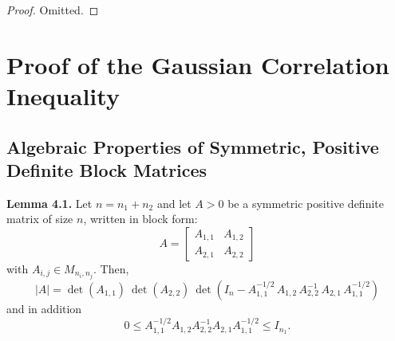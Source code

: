 \documentclass[12pt]{article}
\begin{document}
\begin{proof}
    Omitted.
\end{proof}

\section{Proof of the Gaussian Correlation Inequality}

\subsection{Algebraic Properties of Symmetric, Positive Definite Block Matrices}

\textbf{Lemma 4.1.} Let $n = n_1 + n_2$ and let $A > 0$ be a symmetric positive definite matrix of size $n$, written in block form:
\[
A =
\begin{bmatrix}
A_{1,1} & A_{1,2} \\
A_{2,1} & A_{2,2}
\end{bmatrix}
\]
with $A_{i,j} \in M_{n_i, n_j}$.
Then,
\[
|A| =\det(A_{1,1}) \ \det(A_{2,2}) \ \det\!\left(I_n - A^{-1/2}_{1,1} \, A_{1,2} \, A^{-1}_{2,2} \, A_{2,1} \, A^{-1/2}_{1,1}\right)
\]
and in addition
\[
0 \leq A_{1,1}^{-1/2} A_{1,2} A_{2,2}^{-1} A_{2,1} A_{1,1}^{-1/2} \leq I_{n_1}.
\]
\end{document}

